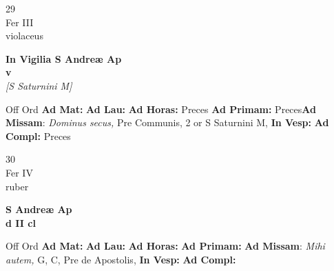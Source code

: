\documentclass[10pt, openany]{book}
\begin{document}
    \begin{center}
        \begin{minipage}{3.5in}
            \vspace{2em}
            \begin{minipage}{0.5in}
                {\Huge 29} \\
                {\normalsize Fer III} \\
                {\normalsize violaceus}
            \end{minipage}
            \begin{minipage}{3.0in}
                \textbf{ \large In Vigilia S Andreæ Ap \\
                \textnormal{\normalsize v}} \\ \textit{[S Saturnini M]} \\ 
            \end{minipage}
            \begin{justify}Off Ord
                \textbf{Ad Mat: }
                \textbf{Ad Lau: }
                \textbf{Ad Horas: }Preces
                \textbf{Ad Primam: }Preces\textbf{Ad Missam}: \textit{Dominus secus,} Pre Communis, 2 or S Saturnini M,  
                \textbf{In Vesp: }
                \textbf{Ad Compl: }Preces
            \end{justify}
        \end{minipage}
    \end{center}

    \begin{center}
        \begin{minipage}{3.5in}
            \vspace{2em}
            \begin{minipage}{0.5in}
                {\Huge 30} \\
                {\normalsize Fer IV} \\
                {\normalsize ruber}
            \end{minipage}
            \begin{minipage}{3.0in}
                \textbf{ \large S Andreæ Ap \\
                \textnormal{\normalsize d II cl}} \\ 
            \end{minipage}
            \begin{justify}Off Ord
                \textbf{Ad Mat: }
                \textbf{Ad Lau: }
                \textbf{Ad Horas: }
                \textbf{Ad Primam: }\textbf{Ad Missam}: \textit{Mihi autem,} G, C, Pre de Apostolis,  
                \textbf{In Vesp: }
                \textbf{Ad Compl: }
            \end{justify}
        \end{minipage}
    \end{center}
\end{document}
